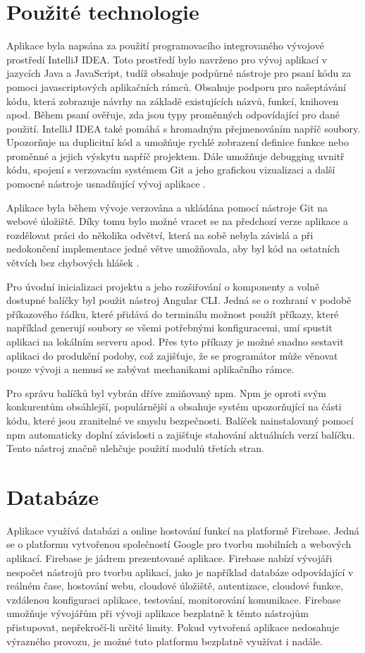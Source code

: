     \section{Použité technologie}
Aplikace byla napsána za použití programovacího integrovaného vývojové prostředí IntelliJ IDEA. Toto prostředí bylo navrženo pro vývoj aplikací v jazycích Java a JavaScript, tudíž obsahuje podpůrné nástroje pro psaní kódu za pomoci javascriptových aplikačních rámců. Obsahuje podporu pro našeptávání kódu, která zobrazuje návrhy na základě existujících názvů, funkcí, knihoven apod. Během psaní ověřuje, zda jsou typy proměnných odpovídající pro dané použití. IntelliJ IDEA také pomáhá s hromadným přejmenováním napříč soubory. Upozorňuje na duplicitní kód a umožńuje rychlé zobrazení definice funkce nebo proměnné a jejich výskytu napříč projektem. Dále umožňuje debugging uvnitř kódu, spojení s verzovacím systémem Git a jeho grafickou vizualizaci a další pomocné nástroje usnadňující vývoj aplikace \cite{intellijidea}.

Aplikace byla během vývoje verzována a ukládána pomocí nástroje Git na webové úložiště. Díky tomu bylo možné vracet se na předchozí verze aplikace a rozdělovat práci do několika odvětví, která na sobě nebyla závislá a při nedokončení implementace jedné větve umožňovala, aby byl kód na ostatních větvích bez chybových hlášek \cite{gitreference}.

Pro úvodní inicializaci projektu a jeho rozšiřování o komponenty a volně dostupné balíčky byl použit nástroj Angular CLI. Jedná se o rozhraní v podobě příkazového řádku, které přidává do terminálu možnost použít příkazy, které například generují soubory se všemi potřebnými konfiguracemi, umí spustit aplikaci na lokálním serveru apod. Přes tyto příkazy je možné snadno sestavit aplikaci do produkční podoby, což zajišťuje, že se programátor může věnovat pouze vývoji a nemusí se zabývat mechanikami aplikačního rámce.

Pro správu balíčků byl vybrán dříve zmiňovaný npm. Npm je oproti svým konkurentům obsáhlejší, populárnější a obsahuje systém upozorňující na části kódu, které jsou zranitelné ve smyslu bezpečnosti. Balíček nainstalovaný pomocí npm automaticky doplní závislosti a zajišťuje stahování aktuálních verzí balíčku. Tento nástroj značně ulehčuje použití modulů třetích stran.

    \section{Databáze}
Aplikace využívá databázi a online hostování funkcí na platformě Firebase. Jedná se o platformu vytvořenou společností Google pro tvorbu mobilních a webových aplikací. Firebase je jádrem prezentované aplikace. Firebase nabízí vývojáři nespočet nástrojů pro tvorbu aplikací, jako je například databáze odpovídající v reálném čase, hostování webu, cloudové úložiště, autentizace, cloudové funkce, vzdálenou konfiguraci aplikace, testování, monitorování komunikace. Firebase umožňuje vývojářům při vývoji aplikace bezplatně k těmto nástrojům přistupovat, nepřekročí-li určité limity. Pokud vytvořená aplikace nedosahuje výrazného provozu, je možné tuto platformu bezplatně využívat i nadále.

